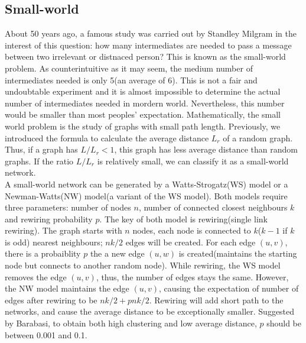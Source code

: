 \documentclass[12pt]{article}
\begin{document}
\subsection{Small-world}
\label{small_world}
About 50 years ago, a famous study was carried out by Standley Milgram\cite{milgram1967small} in the interest of this question: how many intermediates are needed to pass a message between two irrelevant or distnaced person? This is known as the small-world problem. As counterintuitive as it may seem, the medium number of intermediates needed is only 5(an average of 6). This is not a fair and undoubtable experiment and it is almost impossible to determine the actual number of intermediates needed in mordern world. Nevertheless, this number would be smaller than most peoples' expectation. Mathematically, the small world problem is the study of graphs with small path length. Previously, we introduced the formula to calculate the average distance $L_r$ of a random graph. Thus, if a graph has $L/L_r <1$, this graph has less average distance than random graphs. If the ratio $L/L_r$ is relatively small, we can classify it as a small-world network.\\
\noindent
A small-world network can be generated by a Watts-Strogatz(WS) model\cite{wsmodel} or a Newman-Watts(NW) model(a variant of the WS model)\cite{nwmodel}. Both models require three parameters: number of nodes $n$, number of connected closest neighbours $k$ and rewiring probability $p$. The key of both model is rewiring(single link rewiring). The graph starts with $n$ nodes, each node is connected to $k$($k-1$ if $k$ is odd) nearest neighbours; $nk/2$ edges will be created. For each edge $(u,v)$, there is a probaiblity $p$ the a new edge $(u,w)$ is created(maintains the starting node but connects to another random node). While rewiring, the WS model removes the edge $(u,v)$, thus, the number of edges stays the same. However, the NW model maintains the edge $(u,v)$, causing the expectation of number of edges after rewiring to be $nk/2+pnk/2$. Rewiring will add short path to the networks, and cause the average distance to be exceptionally smaller. Suggested by Barabasi\cite{barabási2016network}, to obtain both high clustering and low average distance, $p$ should be between 0.001 and 0.1.\\
\end{document}
